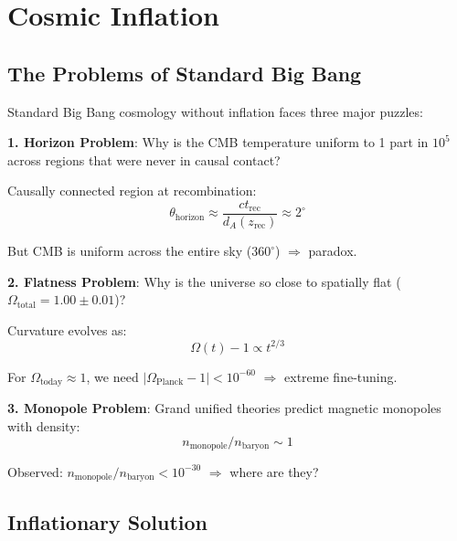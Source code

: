 \section{Cosmic Inflation}

\subsection{The Problems of Standard Big Bang}

\begin{defn}\label{def:bigbang-problems}
Standard Big Bang cosmology without inflation faces three major puzzles\cite{guth1981,linde1982}:

\textbf{1. Horizon Problem}: Why is the CMB temperature uniform to 1 part in $10^5$ across regions that were never in causal contact?

Causally connected region at recombination:
\begin{equation}
\theta_{\text{horizon}} \approx \frac{c t_{\text{rec}}}{d_A(z_{\text{rec}})} \approx 2^\circ
\end{equation}

But CMB is uniform across the entire sky ($360^\circ$) $\Rightarrow$ paradox.

\textbf{2. Flatness Problem}: Why is the universe so close to spatially flat ($\Omega_{\text{total}} = 1.00 \pm 0.01$)?

Curvature evolves as:
\begin{equation}
\Omega(t) - 1 \propto t^{2/3}
\end{equation}

For $\Omega_{\text{today}} \approx 1$, we need $|\Omega_{\text{Planck}} - 1| < 10^{-60}$ $\Rightarrow$ extreme fine-tuning.

\textbf{3. Monopole Problem}: Grand unified theories predict magnetic monopoles with density:
\begin{equation}
n_{\text{monopole}} / n_{\text{baryon}} \sim 1
\end{equation}

Observed: $n_{\text{monopole}} / n_{\text{baryon}} < 10^{-30}$ $\Rightarrow$ where are they?
\end{defn}

\subsection{Inflationary Solution}

